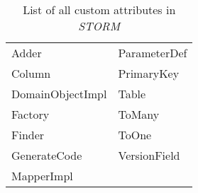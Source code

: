 \begin{longtable}{l|l}
	\caption{\label{tab:designAttributes} List of all custom attributes in \textit{STORM}}\\
	Adder & ParameterDef\\
	Column & PrimaryKey\\
	DomainObjectImpl & Table\\
	Factory & ToMany\\
	Finder & ToOne\\
	GenerateCode & VersionField\\
	MapperImpl & \\
\end{longtable}